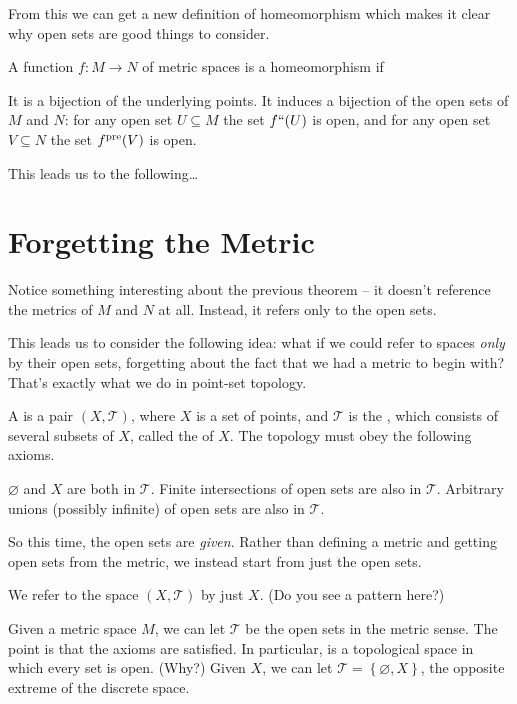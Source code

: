 From this we can get a new definition of homeomorphism
which makes it clear why open sets are good things to consider.
\begin{theorem}
	A function $f : M \to N$ of metric spaces is a homeomorphism if 
	\begin{enumerate}[(i)]
		\ii It is a bijection of the underlying points.
		\ii It induces a bijection of the open sets of $M$ and $N$:
		for any open set $U \subseteq M$ the set $f``(U)$ is open,
		and for any open set $V \subseteq N$ the set $f^{\text{pre}}(V)$ is open.
	\end{enumerate}
\end{theorem}

This leads us to the following\dots

\section{Forgetting the Metric}
Notice something interesting about the previous theorem -- it doesn't reference the metrics of $M$ and $N$ at all.
Instead, it refers only to the open sets.

This leads us to consider the following idea: what if we could refer to spaces \emph{only} by their open sets, forgetting about the fact that we had a metric to begin with?
That's exactly what we do in point-set topology.

\begin{definition}
	A  is a pair $(X, \mathcal T)$,
	where $X$ is a set of points,
	and $\mathcal T$ is the , which consists of several subsets of $X$, called the  of $X$.
	The topology must obey the following axioms.
	\begin{itemize}
		\ii $\varnothing$ and $X$ are both in $\mathcal T$.
		\ii Finite intersections of open sets are also in $\mathcal T$.
		\ii Arbitrary unions (possibly infinite) of open sets are also in $\mathcal T$.
	\end{itemize}
\end{definition}
So this time, the open sets are \emph{given}.
Rather than defining a metric and getting open sets from the metric,
we instead start from just the open sets.
\begin{abuse}
	We refer to the space $(X, \mathcal T)$ by just $X$.
	(Do you see a pattern here?)
\end{abuse}

\begin{example}
	\listhack
	\begin{enumerate}[(a)]
		\ii Given a metric space $M$, we can let $\mathcal T$ be
		the open sets in the metric sense.
		The point is that the axioms are satisfied.
		\ii In particular,  is a topological space in which every set is open. (Why?)
		\ii Given $X$, we can let $\mathcal T = \left\{ \varnothing, X \right\}$,
		the opposite extreme of the discrete space.
	\end{enumerate}
\end{example}

